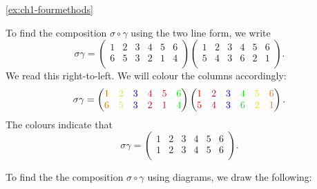 \begin{solution}{\ref{ex:ch1-fourmethods}}
{     To find the composition \(\sigma\circ\gamma\) using the two line form, we write
    \[
    \sigma\gamma = \begin{pmatrix}
        1 & 2 & 3 & 4 & 5 & 6\\
        6 & 5 & 3 & 2 & 1 & 4\\
    \end{pmatrix}\begin{pmatrix}
        1 & 2 & 3 & 4 & 5 & 6\\
        5 & 4 & 3 & 6 & 2 & 1\\
    \end{pmatrix}.
    \]
    We read this right-to-left. We will colour the columns accordingly:
    \[
    \sigma\gamma = \begin{pmatrix}
        \textcolor{orange!90!black}{1} & \textcolor{yellow!90!black}{2} & \textcolor{blue!90!black}{3} & \textcolor{purple!90!black}{4} & \textcolor{red!90!black}{5} & \textcolor{green!90!black}{6}\\
        \textcolor{orange!90!black}{6} & \textcolor{yellow!90!black}{5} & \textcolor{blue!90!black}{3} & \textcolor{purple!90!black}{2} & \textcolor{red!90!black}{1} & \textcolor{green!90!black}{4}\\
    \end{pmatrix}\begin{pmatrix}
        \textcolor{red!90!black}{1} & \textcolor{purple!90!black}{2} & \textcolor{blue!90!black}{3} & \textcolor{green!90!black}{4} & \textcolor{yellow!90!black}{5} & \textcolor{orange!90!black}{6}\\
        \textcolor{red!90!black}{5} & \textcolor{purple!90!black}{4} & \textcolor{blue!90!black}{3} & \textcolor{green!90!black}{6} & \textcolor{yellow!90!black}{2} & \textcolor{orange!90!black}{1}\\
    \end{pmatrix}.
    \]
    The colours indicate that
    \[
    \sigma\gamma = \begin{pmatrix}
        1 & 2 & 3 & 4 & 5 & 6\\
        1 & 2 & 3 & 4 & 5 & 6\\
    \end{pmatrix}.
    \]

     To find the the composition \(\sigma\circ\gamma\) using diagrams, we draw the following:

    \begin{figure}[h]
        \centering
\end{figure}}
\end{solution}
